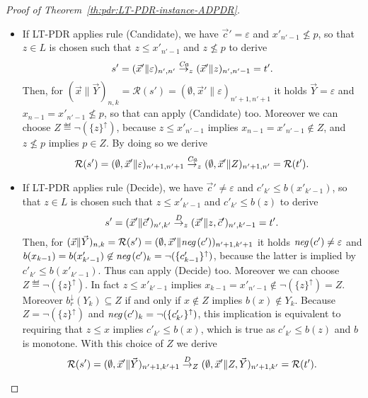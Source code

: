 \begin{proof}[Proof of Theorem~\ref{th:pdr:LT-PDR-instance-ADPDR}]
\begin{itemize}
		\item If LT-PDR applies rule (Candidate), we have $\vec{c}' = \varepsilon$ and $x'_{n'-1} \not \leq p$, so that $z\in L$ is chosen such that $z\leq x'_{n'-1}$ and $z\not\leq p$ to derive
		      \[
		      s'=( \vec{x}' \| \varepsilon )_{n',n'} \stackrel{\mathit{Ca}}{\to}_z ( \vec{x}' \| z)_{n',n'-1}=t'\text{.}
		      \]
		      Then, for $( \vec{x} \| \vec{Y} )_{n,k} = \mathcal{R}(s') = ( \emptyset,\vec{x}' \| \varepsilon )_{n'+1,n'+1}$ it holds $\vec{Y} = \varepsilon$ and $x_{n-1}=x'_{n'-1} \not \leq p$, so that {\ADPDR} can apply (Candidate) too. Moreover we can choose $Z \eqdef \lnot (\{ z \}^{\uparrow})$, because $z \leq x'_{n'-1}$ implies $x_{n-1}=x'_{n'-1} \not \in Z$, and $z \not \leq p$ implies $p \in Z$. By doing so we derive
		      \[
		      \mathcal{R}(s')=( \emptyset,\vec{x}' \| \varepsilon )_{n'+1,n'+1} \stackrel{\mathit{Ca}}{\to}_z ( \emptyset,\vec{x}' \| Z)_{n'+1,n'}=\mathcal{R}(t') \text{.}
		      \]

		\item If LT-PDR applies rule (Decide), we have $\vec{c}'\neq \varepsilon$ and $c'_{k'} \leq b(x'_{k'-1})$,  so that $z\in L$ is chosen such that $z \leq x'_{k'-1}$ and $c'_{k'} \leq b(z)$ to derive
		      \[
		      s'=( \vec{x}' \| \vec{c}' )_{n',k'} \stackrel{D}{\to}_z ( \vec{x}' \| z,\vec{c}')_{n',k'-1}=t'\text{.}
		      \]
		      Then, for $( \vec{x} \| \vec{Y} )_{n,k} = \mathcal{R}(s') = ( \emptyset,\vec{x}' \| \textit{neg}\,(c') )_{n'+1,k'+1}$ it holds $\textit{neg}\,(c') \neq \varepsilon$ and $b(x_{k-1})=b(x'_{k'-1})\not\in \textit{neg}\,(c')_k=\lnot (\{ c'_{k-1} \}^{\uparrow})$, because the latter is implied by $c'_{k'} \leq b(x'_{k'-1})$. Thus {\ADPDR} can apply (Decide) too. Moreover we can choose $Z \eqdef \lnot (\{ z \}^{\uparrow})$. In fact $z \leq x'_{k'-1}$ implies $x_{k-1}=x'_{n'-1} \not \in \lnot (\{ z \}^{\uparrow})=Z$. Moreover $b^{\downarrow}_r(Y_{k}) \subseteq Z$ if and only if $x \not \in Z$ implies $b(x) \not \in Y_{k}$. Because $Z = \lnot (\{ z \}^{\uparrow})$ and $\textit{neg}\,(c')_{k} = \lnot (\{ c'_{k'} \}^{\uparrow})$, this implication is equivalent to requiring that $z \leq x$ implies $c'_{k'} \leq b(x)$, which is true as $c'_{k'} \leq b(z)$ and $b$ is monotone. With this choice of $Z$ we derive
		      \[
		      \mathcal{R}(s')=( \emptyset,\vec{x}' \| \vec{Y} )_{n'+1,k'+1} \stackrel{D}{\to}_Z ( \emptyset,\vec{x}' \| Z,\vec{Y})_{n'+1,k'}=\mathcal{R}(t')\text{.}
		      \]


\end{itemize}
\end{proof}
